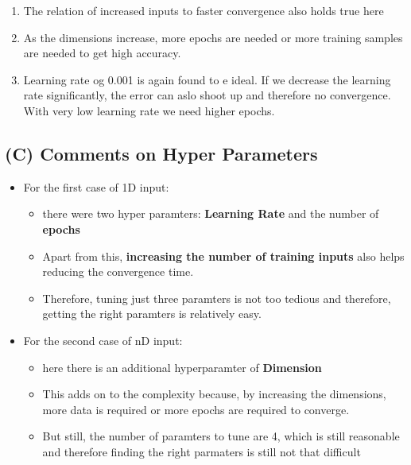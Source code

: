 \documentclass[11pt]{article}
\providecommand{\tightlist}{%
      \setlength{\itemsep}{0pt}\setlength{\parskip}{0pt}}
\begin{document}
\begin{enumerate}
\def\labelenumi{\arabic{enumi}.}
\tightlist
\item
  The relation of increased inputs to faster convergence also holds true
  here
\item
  As the dimensions increase, more epochs are needed or more training
  samples are needed to get high accuracy.
\item
  Learning rate og 0.001 is again found to e ideal. If we decrease the
  learning rate significantly, the error can aslo shoot up and therefore
  no convergence. With very low learning rate we need higher epochs.
\end{enumerate}

    \subsection{(C) Comments on Hyper
Parameters}\label{c-comments-on-hyper-parameters}

\begin{itemize}
\tightlist
\item
  For the first case of 1D input:

  \begin{itemize}
  \tightlist
  \item
    there were two hyper paramters: \textbf{Learning Rate} and the
    number of \textbf{epochs}
  \item
    Apart from this, \textbf{increasing the number of training inputs}
    also helps reducing the convergence time.
  \item
    Therefore, tuning just three paramters is not too tedious and
    therefore, getting the right paramters is relatively easy.
  \end{itemize}
\item
  For the second case of nD input:

  \begin{itemize}
  \tightlist
  \item
    here there is an additional hyperparamter of \textbf{Dimension}
  \item
    This adds on to the complexity because, by increasing the
    dimensions, more data is required or more epochs are required to
    converge.
  \item
    But still, the number of paramters to tune are 4, which is still
    reasonable and therefore finding the right parmaters is still not
    that difficult
  \end{itemize}
\end{itemize}


    
    
    
    
\end{document}
